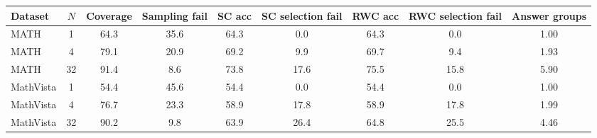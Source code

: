 \begin{tabular}{lcccccccc}\toprule Dataset & $N$ & Coverage & Sampling fail & SC acc & SC selection fail & RWC acc & RWC selection fail & Answer groups \\ \midrule
MATH & 1 & 64.3 & 35.6 & 64.3 & 0.0 & 64.3 & 0.0 & 1.00 \\
MATH & 4 & 79.1 & 20.9 & 69.2 & 9.9 & 69.7 & 9.4 & 1.93 \\
MATH & 32 & 91.4 & 8.6 & 73.8 & 17.6 & 75.5 & 15.8 & 5.90 \\
MathVista & 1 & 54.4 & 45.6 & 54.4 & 0.0 & 54.4 & 0.0 & 1.00 \\
MathVista & 4 & 76.7 & 23.3 & 58.9 & 17.8 & 58.9 & 17.8 & 1.99 \\
MathVista & 32 & 90.2 & 9.8 & 63.9 & 26.4 & 64.8 & 25.5 & 4.46 \\
\bottomrule\end{tabular}
